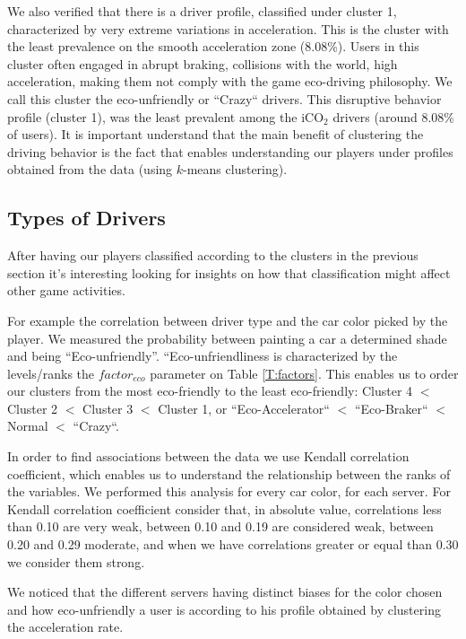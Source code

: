 \documentclass[preprint,authoryear,12pt]{elsarticle}
\begin{document}
We also verified that there is a driver profile, classified under cluster 1, characterized by very extreme variations in acceleration. This is the cluster with the least prevalence on the smooth acceleration zone (8.08\%). Users in this cluster often engaged in abrupt braking, collisions with the world, high acceleration, making them not comply with the game eco-driving philosophy. We call this cluster the eco-unfriendly or ``Crazy`` drivers.
This disruptive behavior profile (cluster 1), was the least prevalent among the iCO$_2$ drivers (around 8.08\% of users).
It is important understand that the main benefit of clustering the driving behavior is the fact that enables understanding our players under profiles obtained from the data (using $k$-means clustering).


\subsection{Types of Drivers}

After having our players classified according to the clusters in the previous section it's interesting  looking for insights on how that classification might affect other game activities.


For example the correlation between driver type and the car color picked by the player. We measured the probability between painting a car a determined shade and being “Eco-unfriendly”.
“Eco-unfriendliness is characterized by the levels/ranks the $factor_{eco}$ parameter on Table \ref{T:factors}. This enables us to order our clusters from the most eco-friendly to the least eco-friendly: Cluster 4 $<$ Cluster 2 $<$ Cluster 3 $<$ Cluster 1, or ``Eco-Accelerator``  $<$ ``Eco-Braker`` $<$  Normal $<$ ``Crazy``.


In order to find associations between the data we use Kendall correlation coefficient, which enables us to understand the relationship between the ranks of the variables. We performed this analysis for every car color, for each server.
For Kendall correlation coefficient consider that, in absolute value, correlations less than 0.10 are very weak, between 0.10 and 0.19 are considered weak, between 0.20 and 0.29 moderate, and when we have correlations greater or equal than 0.30 we consider them strong.

We noticed that the different servers having distinct biases for the color chosen and how eco-unfriendly a user is according to his profile obtained by clustering the acceleration rate.
\end{document}
